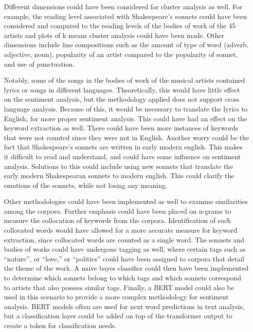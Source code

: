 \documentclass[11pt]{article}
\begin{document}
\noindent Different dimensions could have been considered for cluster analysis as well. For example, the reading level associated with Shakespeare’s sonnets could have been considered and compared to the reading levels of the bodies of work of the 45 artists and plots of k means cluster analysis could have been made. Other dimensions include line compositions such as the amount of type of word (adverb, adjective, noun), popularity of an artist compared to the popularity of sonnet, and use of punctuation. 

\noindent Notably, some of the songs in the bodies of work of the musical artists contained lyrics or songs in different languages. Theoretically, this would have little effect on the sentiment analysis, but the methodology applied does not support cross language analysis. Because of this, it would be necessary to translate the lyrics to English, for more proper sentiment analysis. This could have had an effect on the keyword extraction as well. There could have been more instances of keywords that were not counted since they were not in English. Another worry could be the fact that Shakespeare’s sonnets are written in early modern english. This makes it difficult to read and understand, and could have some influence on sentiment analysis. Solutions to this could include using new sonnets that translate the early modern Shakespearan sonnets to modern english. This could clarify the emotions of the sonnets, while not losing any meaning. 

\noindent Other methodologies could have been implemented as well to examine similarities among the corpora. Further emphasis could have been placed on n-grams to measure the collocation of keywords from the corpora. Identification of such collocated words would have allowed for a more accurate measure for keyword extraction, since collocated words are counted as a single word. The sonnets and bodies of works could have undergone tagging as well, where certain tags such as “nature”, or “love,” or “politics” could have been assigned to corpora that detail the theme of the work. A naive bayes classifier could then have been implemented to determine which sonnets belong to which tags and which sonnets correspond to artists that also possess similar tags. Finally, a BERT model could also be used in this scenario to provide a more complex methodology for sentiment analysis. BERT models often are used for next word predictions in text analysis, but a classification layer could be added on top of the transformer output to create a token for classification needs. 
\end{document}
